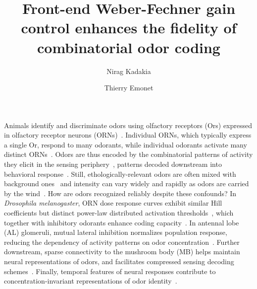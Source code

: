 \documentclass[9pt,twocolumn,twoside]{pnas-new}
\title{Front-end Weber-Fechner gain control enhances the fidelity of combinatorial odor coding}
\author[a]{Nirag Kadakia}
\author[a,b]{Thierry Emonet}
\affil[a]{Department of Molecular, Cellular, and Developmental Biology}
\affil[b]{Department of Physics, Yale University, New Haven, CT 06511}
\begin{document}

\maketitle
\thispagestyle{firststyle}





Animals identify and discriminate odors using olfactory receptors (Ors) expressed in olfactory receptor neurons (ORNs)~\cite{chemoreceptors_review,buck1991novel,or_discovery_carlson,or_discovery_vosshall}. Individual ORNs, which typically express a single Or, respond to many odorants, while individual odorants activate many distinct ORNs~\cite{friedrich1997combinatorial,hallem_carlson,mosquito_combinatorial_coding,nara2011large}. Odors are  thus encoded by the combinatorial patterns of activity they elicit in the sensing periphery~\cite{malnic1999combinatorial, mosquito_combinatorial_coding, hildebrand1997mechanisms, hallem_carlson, debryune_odor_coding, friedrich1997combinatorial}, patterns  decoded downstream into behavioral response~\cite{early_olfactory_processing}.  Still, ethologically-relevant odors are often mixed with background ones~\cite{odor_backgrounds} and intensity can vary widely and rapidly as odors are carried by the wind~\cite{murlis_odor_plumes, fluid_dynamics_chemosensory, celani, carde_navigation}. How are odors recognized reliably despite these confounds? %
In \textit{Drosophila melanogaster}, ORN dose response curves exhibit similar Hill coefficients but distinct power-law distributed activation thresholds~\cite{hallem_carlson, si2017invariances}, which together with inhibitory odorants enhance coding capacity~\cite{si2017invariances, Cao_Tu_WL, hallem_carlson, stevens}. In antennal lobe (AL) glomeruli, mutual lateral inhibition normalizes population response, reducing the dependency of activity patterns on odor concentration~\cite{lateral_inh_asahina, divisive_normalization}. Further downstream, sparse connectivity to the mushroom body (MB) helps maintain neural representations of odors, and facilitates compressed sensing decoding schemes~\cite{abbott_axel, litwinkumar, vijay_1}. Finally, temporal features of neural responses contribute to concentration-invariant representations of odor identity~\cite{stopfer_nat_neuro, stopfer_temporal_model, stopfer_temporal_channel, primacy_coding}.
\end{document}
